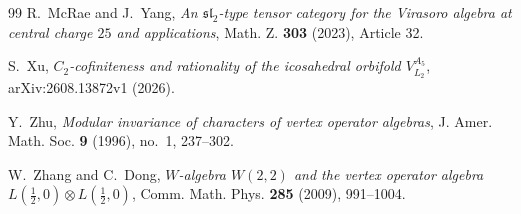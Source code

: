 \documentclass[12pt,leqno]{amsart}
\numberwithin{equation}{section} \newtheorem{thm}{Theorem}[section] \newtheorem{lem}[thm]{Lemma} \newtheorem{ex}[thm]{Example} \newtheorem{prop}[thm]{Proposition} \newtheorem{cor}[thm]{Corollary} \newtheorem{defi}[thm]{Definition} \newtheorem{rmk}[thm]{Remark} \newtheorem{notation}[thm]{Notation}
\begin{document}
\begin{thebibliography}{99}
R.~McRae and J.~Yang,
\emph{An $\mathfrak{sl}_2$-type tensor category for the Virasoro algebra at central charge $25$ and applications},
Math. Z. \textbf{303} (2023), Article 32.

S.~Xu,
\emph{$C_2$-cofiniteness and rationality of the icosahedral orbifold $V_{L_2}^{A_5}$},
arXiv:2608.13872v1 (2026).

Y.~Zhu,
\emph{Modular invariance of characters of vertex operator algebras},
J. Amer. Math. Soc. \textbf{9} (1996), no.~1, 237--302.

W.~Zhang and C.~Dong,
\emph{$W$-algebra $W(2,2)$ and the vertex operator algebra $L(\frac12,0)\otimes L(\frac12,0)$},
Comm. Math. Phys. \textbf{285} (2009), 991--1004.

\end{thebibliography}
\endgroup
\end{document}
